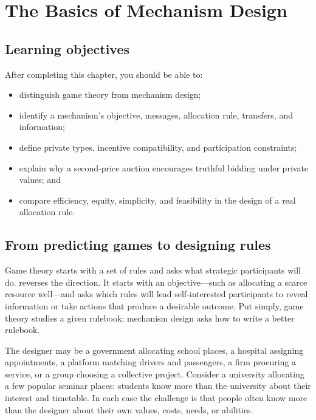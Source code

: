 \chapter{The Basics of Mechanism Design}
\label{chap:mechanism-design}

\section{Learning objectives}

After completing this chapter, you should be able to:
\begin{itemize}
  \item distinguish game theory from mechanism design;
  \item identify a mechanism's objective, messages, allocation rule, transfers, and information;
  \item define private types, incentive compatibility, and participation constraints;
  \item explain why a second-price auction encourages truthful bidding under private values; and
  \item compare efficiency, equity, simplicity, and feasibility in the design of a real allocation rule.
\end{itemize}

\section{From predicting games to designing rules}

Game theory starts with a set of rules and asks what strategic participants
will do.  reverses the direction. It starts with an
objective---such as allocating a scarce resource well---and asks which rules
will lead self-interested participants to reveal information or take actions
that produce a desirable outcome. Put simply, game theory studies a given
rulebook; mechanism design asks how to write a better rulebook.

The designer may be a government allocating school places, a hospital assigning
appointments, a platform matching drivers and passengers, a firm procuring a
service, or a group choosing a collective project. Consider a university
allocating a few popular seminar places: students know more than the university
about their interest and timetable. In each case the challenge is that people
often know more than the designer about their own values, costs, needs, or
abilities.

